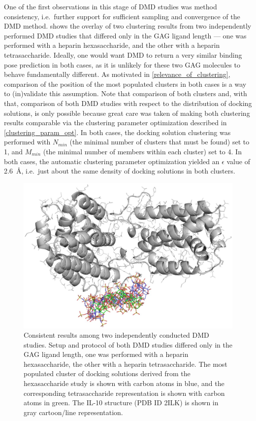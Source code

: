 One of the first observations in this stage of DMD studies was method
consistency, i.e.\ further support for sufficient sampling and convergence of
the DMD method. 
shows the overlay of two clustering results from two independently performed DMD
studies that differed only in the GAG ligand length --- one was performed with a
heparin hexasaccharide, and the other with a heparin tetrasaccharide. Ideally,
one would want DMD to return a very similar binding pose prediction in both
cases, as it is unlikely for these two GAG molecules to behave fundamentally
different. As motivated in \cref{relevance_of_clustering}, comparison of the
position of the most populated clusters in both cases is a way to (in)validate
this assumption. Note that comparison of both clusters and, with that,
comparison of both DMD studies with respect to the distribution of docking
solutions, is only possible because great care was taken of making both
clustering results comparable via the clustering parameter optimization
described in \cref{clustering_param_opt}. In both cases, the docking solution
clustering was performed with $N_{min}$ (the minimal number of clusters that
must be found) set to 1, and $M_{min}$ (the minimal number of members within
each cluster) set to 4. In both cases, the automatic clustering parameter
optimization yielded an $\epsilon$ value of \SI{2.6}{\angstrom}, i.e.\ just
about the same density of docking solutions in both clusters.

\begin{figure}
\centering
\includegraphics[width=1.0\textwidth]{gfx/dmdil10/hp_hexa_vs_tetra_clusters_position_match_cropped.jpg}
\caption[]{Consistent results among two independently conducted DMD studies.
Setup and protocol of both DMD studies differed only in the GAG ligand length,
one was performed with a heparin hexasaccharide, the other with a heparin
tetrasaccharide. The most populated cluster of docking solutions derived from
the hexasaccharide study is shown with carbon atoms in blue, and the
corresponding tetrasaccharide representation is shown with carbon atoms in
green. The IL-10 structure (PDB ID 2ILK) is shown in gray cartoon/line
representation.}
\label{fig:dmdil10:hp_hexa_vs_tetra_clusters_position_match}
\end{figure}

